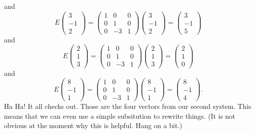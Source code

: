 \documentclass[11pt]{amsart}
\theoremstyle{definition}
\begin{document}
and
\[
E \begin{pmatrix} 3 \\ -1 \\ 2 \end{pmatrix} =
\begin{pmatrix} 1 & 0 & 0 \\ 0 & 1 & 0 \\ 0 & -3 & 1 \end{pmatrix} \begin{pmatrix} 3 \\ -1 \\ 2 \end{pmatrix} = \begin{pmatrix} 3 \\ -1 \\ 5 \end{pmatrix}
\]
and
\[
E \begin{pmatrix} 2 \\ 1 \\ 3 \end{pmatrix} =
\begin{pmatrix} 1 & 0 & 0 \\ 0 & 1 & 0 \\ 0 & -3 & 1 \end{pmatrix} \begin{pmatrix} 2 \\ 1 \\ 3 \end{pmatrix} = \begin{pmatrix} 2 \\ 1 \\ 0 \end{pmatrix}
\]
and
\[
E \begin{pmatrix} 8 \\ -1 \\ 1 \end{pmatrix} =
\begin{pmatrix} 1 & 0 & 0 \\ 0 & 1 & 0 \\ 0 & -3 & 1 \end{pmatrix} \begin{pmatrix} 8 \\ -1 \\ 1 \end{pmatrix} = \begin{pmatrix} 8 \\ -1 \\ 4 \end{pmatrix}.
\]
Ha Ha! It all checks out. Those are the four vectors from our second system. This means that we can even use a simple subsitution to rewrite things. (It is not obvious at the moment why this is helpful. Hang on a bit.)
\end{document}
